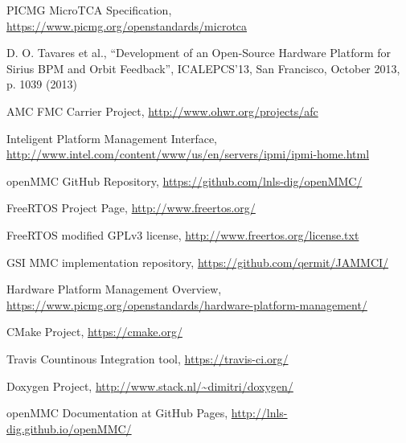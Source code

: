 \documentclass[a4paper,
              ]{jacow}
\begin{document}
\begin{thebibliography}{99}   %

  PICMG MicroTCA Specification,
  \url{https://www.picmg.org/openstandards/microtca}

  D. O. Tavares et al.,
  ``Development of an Open-Source Hardware Platform for Sirius BPM and Orbit Feedback'',
  ICALEPCS'13, San Francisco, October 2013, p. 1039 (2013)

  AMC FMC Carrier Project,
  \url{http://www.ohwr.org/projects/afc}

  Inteligent Platform Management Interface,
  \url{http://www.intel.com/content/www/us/en/servers/ipmi/ipmi-home.html}

  openMMC GitHub Repository,
  \url{https://github.com/lnls-dig/openMMC/}

  FreeRTOS Project Page,
  \url{http://www.freertos.org/}

  FreeRTOS modified GPLv3 license,
  \url{http://www.freertos.org/license.txt}

  GSI MMC implementation repository,
  \url{https://github.com/qermit/JAMMCI/}

  Hardware Platform Management Overview,
  \url{https://www.picmg.org/openstandards/hardware-platform-management/}

  CMake Project,
  \url{https://cmake.org/}

  Travis Countinous Integration tool,
  \url{https://travis-ci.org/}

  Doxygen Project,
  \url{http://www.stack.nl/~dimitri/doxygen/}

  openMMC Documentation at GitHub Pages,
  \url{http://lnls-dig.github.io/openMMC/}



\end{thebibliography}

\fi
\end{document}
